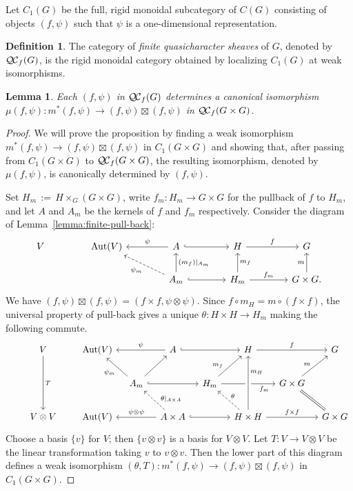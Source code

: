 \documentclass[11pt]{amsart}
\theoremstyle{plain}
\newtheorem{lemma}[theorem]{Lemma}
\theoremstyle{definition}
\newtheorem{definition}[theorem]{Definition}
\theoremstyle{remark}
\DeclareMathOperator{\Aut}{Aut}
\newcommand{\ceq}{{\, :=\, }}
\newcommand{\QC}{{\mathcal{Q\hskip-0.8pt C}}}
\newcommand{\QCf}{{\QC_f}}
\begin{document}
Let $C_1(G)$ be the full, rigid monoidal subcategory of $C(G)$ consisting of objects
$(f,\psi)$ such that $\psi$ is a one-dimensional representation.

\begin{definition}
The category of \emph{finite quasicharacter sheaves} of $G$, denoted by $\QCf(G)$,
is the rigid monoidal category obtained by localizing $C_1(G)$ at weak isomorphisms.
\end{definition}


\begin{lemma}\label{lemma:finite-iso}
Each $(f,\psi)$ in $\QCf(G)$ determines a canonical isomorphism $\mu(f,\psi) : m^*(f,\psi) \to (f,\psi)\boxtimes(f,\psi)$ in $\QCf(G\times G)$. 
 \end{lemma}

\begin{proof}
We will prove the proposition by finding a weak isomorphism $m^*(f,\psi) \to (f,\psi)\boxtimes (f,\psi)$ in $C_1(G\times G)$ and showing that, after passing from $C_1(G\times G)$ to $\QCf(G\times G)$, the resulting isomorphism, denoted by $\mu(f,\psi)$, is canonically determined by $(f,\psi)$.

Set $H_m \ceq H\times_G(G\times G)$, write $f_m : H_m \to G \times G$ for the pullback of $f$ to $H_m$, and let $A$ and $A_m$ be the kernels of $f$ and $f_m$ respectively.  Consider the diagram of Lemma~\ref{lemma:finite-pull-back}:
\[
\begin{tikzcd}[column sep=40]
V & \Aut(V) & \arrow[swap]{l}{\psi} A \arrow[hook]{r} & H \arrow{r}{f} &  G\\
  &  & \arrow[dashed]{ul}{\psi_m} \arrow[swap]{u}{(m_f)\vert_{A_m}} A_m \arrow[hook]{r}
  & \arrow[swap]{u}{m_f} H_m \arrow{r}{f_m} & \arrow{u}{m} G\times G.
\end{tikzcd}
\]
We have $(f,\psi) \boxtimes (f,\psi) = (f\times f, \psi\otimes \psi)$.
Since $f\circ m_H = m \circ (f\times f)$, the universal property of pull-back gives
a unique $\theta : H\times H \to H_m$ making the following commute.
\[
\begin{tikzcd}[row sep=20,column sep=10]
\ & V \arrow{dd}{T} && \Aut(V) && A \arrow[hook]{rr} \arrow[swap]{ll}{\psi} &&  H \arrow{rr}{f} && G\\
 && && \arrow{ul}{\psi_m} A_m  \arrow[hook]{rr} \arrow{ur} && H_m \arrow[pos=0.3]{ur}{m_f} \arrow[swap, pos=0.8]{rr}{f_m}
 && G \times G \arrow[equal]{dr} \arrow[pos=0.42]{ur}{m} & \\
& V\otimes V && \Aut(V) && \arrow[swap]{ll}{\psi \otimes \psi} \arrow[dashed,swap,pos=0.3]{ul}{\theta\vert_{A\times A}} A\times A \arrow[hook]{rr}
&& \arrow[dashed,swap]{ul}{\theta} \arrow[crossing over,swap,pos=0.7]{uu}{m_H} H\times H \arrow{rr}{f\times f} && G\times G
\end{tikzcd}
\]
Choose a basis $\{ v \}$ for $V$; then $\{ v\otimes v \}$ is a basis for $V\otimes V$.
Let $T : V \to V\otimes V$ be the linear transformation taking $v$ to $v\otimes v$. Then the lower part of this
diagram defines a weak isomorphism $(\theta,T): m^*(f,\psi) \to (f,\psi)\boxtimes (f,\psi)$  in $C_1(G\times G)$. 


\end{proof}
\end{document}
